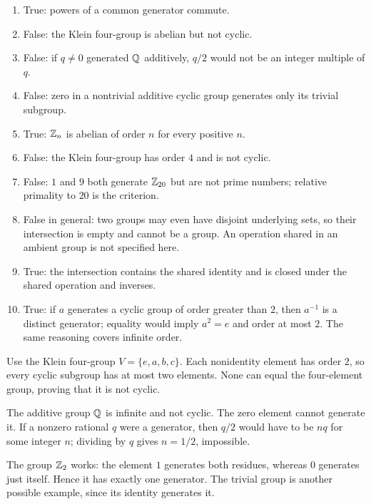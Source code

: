 \begin{enumerate}[label=(\alph*)]
\item True: powers of a common generator commute.
\item False: the Klein four-group is abelian but not cyclic.
\item False: if $q\ne0$ generated $\mathbb{Q}$ additively, $q/2$ would not be an integer multiple of $q$.
\item False: zero in a nontrivial additive cyclic group generates only its trivial subgroup.
\item True: $\mathbb{Z}_n$ is abelian of order $n$ for every positive $n$.
\item False: the Klein four-group has order $4$ and is not cyclic.
\item False: $1$ and $9$ both generate $\mathbb{Z}_{20}$ but are not prime numbers; relative primality to $20$ is the criterion.
\item False in general: two groups may even have disjoint underlying sets, so their intersection is empty and cannot be a group. An operation shared in an ambient group is not specified here.
\item True: the intersection contains the shared identity and is closed under the shared operation and inverses.
\item True: if $a$ generates a cyclic group of order greater than $2$, then $a^{-1}$ is a distinct generator; equality would imply $a^2=e$ and order at most $2$. The same reasoning covers infinite order.
\end{enumerate}


Use the Klein four-group $V=\{e,a,b,c\}$. Each nonidentity element has order $2$, so every cyclic subgroup has at most two elements. None can equal the four-element group, proving that it is not cyclic.


The additive group $\mathbb{Q}$ is infinite and not cyclic. The zero element cannot generate it. If a nonzero rational $q$ were a generator, then $q/2$ would have to be $nq$ for some integer $n$; dividing by $q$ gives $n=1/2$, impossible.


The group $\mathbb{Z}_2$ works: the element $1$ generates both residues, whereas $0$ generates just itself. Hence it has exactly one generator. The trivial group is another possible example, since its identity generates it.

